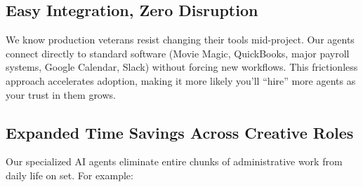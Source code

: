 \documentclass[11pt]{article}
\begin{document}
\subsection{Easy Integration, Zero Disruption}
We know production veterans resist changing their tools mid-project. Our agents connect directly to standard software (Movie Magic, QuickBooks, major payroll systems, Google Calendar, Slack) without forcing new workflows. This frictionless approach accelerates adoption, making it more likely you’ll “hire” more agents as your trust in them grows.

\subsection{Expanded Time Savings Across Creative Roles}
Our specialized AI agents eliminate entire chunks of administrative work from daily life on set. For example:
\end{document}
